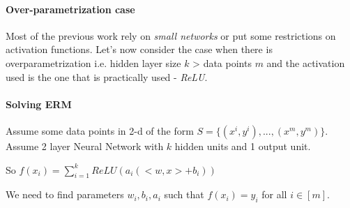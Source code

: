 \paragraph{Over-parametrization case} Most of the previous work rely on \textit{small networks} or put some restrictions on activation functions. Let's now consider the case when there is overparametrization i.e. hidden layer size $k$ > data points $m$ and the activation used is the one that is practically used - \textit{ReLU}.

\paragraph{Solving ERM}
Assume some data points in 2-d of the form $S = \{(x^i,y^i), ... , (x^m,y^m)\}$. Assume 2 layer Neural Network with $k$ hidden units and 1 output unit.

So $f(x_i) = \sum_{i=1}^{k}ReLU(a_i(<w,x> + b_i))$

We need to find parameters $w_i, b_i, a_i$ such that $f(x_i) = y_i$ for all $i \in [m]$.
